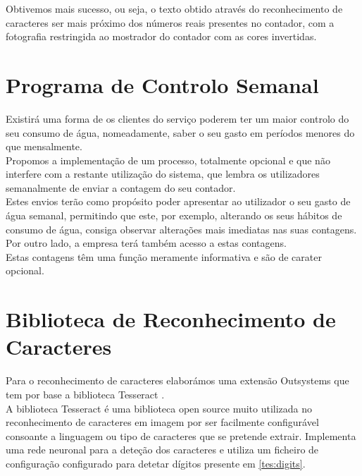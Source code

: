 Obtivemos mais sucesso, ou seja, o texto obtido através do reconhecimento de caracteres ser mais próximo dos números reais presentes no contador, com a fotografia restringida ao mostrador do contador com as cores invertidas.

\section{Programa de Controlo Semanal} \label{rec}
Existirá uma forma de os clientes do serviço poderem ter um maior controlo do seu consumo de água, nomeadamente, saber o seu gasto em períodos menores do que mensalmente.\\
Propomos a implementação de um processo, totalmente opcional e que não interfere com a restante utilização do sistema, que lembra os utilizadores semanalmente de enviar a contagem do seu contador.\\
Estes envios terão como propósito poder apresentar ao utilizador o seu gasto de água semanal, permitindo que este, por exemplo, alterando os seus hábitos de consumo de água, consiga observar alterações mais imediatas nas suas contagens. Por outro lado, a empresa terá também acesso a estas contagens.\\
Estas contagens têm uma função meramente informativa e são de carater opcional.


\section{Biblioteca de Reconhecimento de Caracteres} \label{rec}
Para o reconhecimento de caracteres elaborámos uma extensão Outsystems que tem por base a biblioteca Tesseract \cite{tesseract}.\\
A biblioteca Tesseract é uma biblioteca open source muito utilizada no reconhecimento de caracteres em imagem por ser facilmente configurável consoante a linguagem ou tipo de caracteres que se pretende extrair. Implementa uma rede neuronal para a deteção dos caracteres e utiliza um ficheiro de configuração configurado para detetar dígitos presente em \ref{tes:digits}.


















